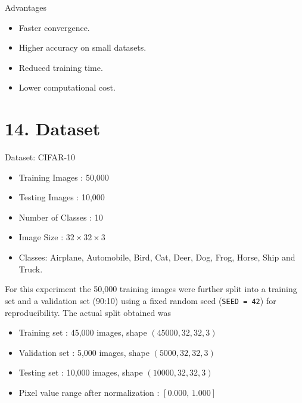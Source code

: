 \documentclass[11pt]{article}
\begin{document}
Advantages

\begin{itemize}
\item Faster convergence.
\item Higher accuracy on small datasets.
\item Reduced training time.
\item Lower computational cost.
\end{itemize}


\section*{14. Dataset}

Dataset: CIFAR-10

\begin{itemize}

\item Training Images : 50,000

\item Testing Images : 10,000

\item Number of Classes : 10

\item Image Size : $32\times32\times3$

\item Classes:
Airplane, Automobile, Bird, Cat, Deer,
Dog, Frog, Horse, Ship and Truck.

\end{itemize}

For this experiment the 50,000 training images were further split into a
training set and a validation set (90:10) using a fixed random seed
(\texttt{SEED = 42}) for reproducibility. The actual split obtained was

\begin{itemize}
\item Training set : 45,000 images, shape $(45000,32,32,3)$
\item Validation set : 5,000 images, shape $(5000,32,32,3)$
\item Testing set : 10,000 images, shape $(10000,32,32,3)$
\item Pixel value range after normalization : $[0.000,\,1.000]$
\end{itemize}

\end{document}
